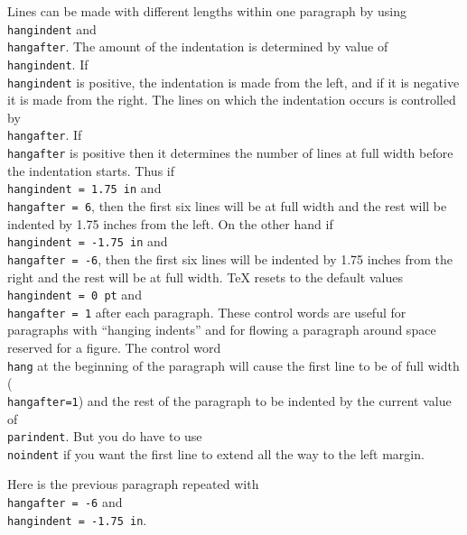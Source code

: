 \def\hangparagraph{ Lines can be made with different lengths 
within one paragraph by using {\tt \\hangindent} and {\tt 
\\hangafter}.  The amount of the indentation is determined by value 
of {\tt \\hangindent}. If {\tt \\hangindent} is positive, the 
indentation is made from the left, and if it is negative it is 
made from the right. The lines on which the indentation occurs is 
controlled by {\tt \\hangafter}.  If {\tt \\hangafter} is 
positive then it determines the number of lines at full width 
before the indentation starts.  Thus if {\tt \\hangindent = 1.75 
in} and {\tt \\hangafter = 6}, then the first six lines will be 
at full width and the rest will be indented by 1.75 inches from 
the left. On the other hand if {\tt \\hangindent = \hbox{-1.75} 
in} and {\tt \\hangafter = -6}, then the first six lines will be 
indented by 1.75 inches from the right and the rest will be at 
full width. \TeX{} resets to the default values {\tt \\hangindent 
= 0 pt} and {\tt \\hangafter = 1} after each paragraph. These 
control words are useful for paragraphs with ``hanging indents'' 
and for flowing a paragraph around space reserved for a figure. 
\TeXref{355}The control word {\tt \\hang} at the beginning of the 
paragraph will cause the first line to be of full width ({\tt 
\\hangafter=1}) and the rest of the paragraph to be indented by 
the current value of {\tt \\parindent}. But you do have to use 
{\tt \\noindent} if you want the first line to extend all the way 
to the left margin. 
\par} 

 \hangindent=1.75in 
\hangparagraph 
{} 

Here is the previous paragraph repeated with {\tt \\hangafter = -6} 
and {\tt \\hangindent = -1.75 in}. 

